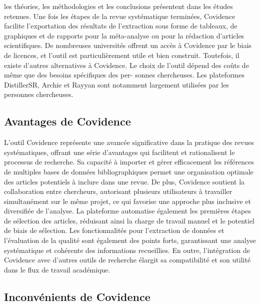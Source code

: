 \documentclass[
  letterpaper,
]{scrbook}
\begin{document}
les théories, les méthodologies et les conclusions présentent dans les
études retenues. Une fois les étapes de la revue systématique terminées,
Covidence facilite l'exportation des résultats de l'extraction sous
forme de tableaux, de graphiques et de rapports pour la méta-analyse ou
pour la rédaction d'articles scientifiques. De nombreuses universités
offrent un accès à Covidence par le biais de licences, et l'outil est
particulièrement utile et bien construit. Toutefois, il existe d'autres
alternatives à Covidence. Le choix de l'outil dépend des coûts de même
que des besoins spécifiques des per- sonnes chercheuses. Les plateformes
DistillerSR, Archie et Rayyan sont notamment largement utilisées par les
personnes chercheuses.

\hypertarget{avantages-de-covidence}{%
\subsection{Avantages de Covidence}\label{avantages-de-covidence}}

L'outil Covidence représente une avancée significative dans la pratique
des revues systématiques, offrant une série d'avantages qui facilitent
et rationalisent le processus de recherche. Sa capacité à importer et
gérer efficacement les références de multiples bases de données
bibliographiques permet une organisation optimale des articles
potentiels à inclure dans une revue. De plus, Covidence soutient la
collaboration entre chercheurs, autorisant plusieurs utilisateurs à
travailler simultanément sur le même projet, ce qui favorise une
approche plus inclusive et diversifiée de l'analyse. La plateforme
automatise également les premières étapes de sélection des articles,
réduisant ainsi la charge de travail manuel et le potentiel de biais de
sélection. Les fonctionnalités pour l'extraction de données et
l'évaluation de la qualité sont également des points forts, garantissant
une analyse systématique et cohérente des informations recueillies. En
outre, l'intégration de Covidence avec d'autres outils de recherche
élargit sa compatibilité et son utilité dans le flux de travail
académique.

\hypertarget{inconvuxe9nients-de-covidence}{%
\subsection{Inconvénients de
Covidence}\label{inconvuxe9nients-de-covidence}}
\end{document}
